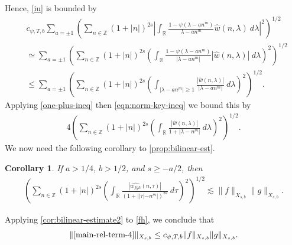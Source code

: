\documentclass[12pt,reqno]{amsart}
\numberwithin{equation}{section}  %
\numberwithin{figure}{section}
\newcommand{\rr}{\mathbb{R}}
\newcommand{\zz}{\mathbb{Z}}
\newcommand{\wh}{\widehat}
\theoremstyle{plain}
\newtheorem{corollary}{Corollary}
\theoremstyle{definition}
\theoremstyle{remark}
\begin{document}
%
Hence, \eqref{iu} is bounded by
%
\begin{equation}
  \begin{split}
    & c_{\psi, T, b} \sum_{a = \pm 1}\left( \sum_{n \in \zz} \left (1 + |n| \right )^{2s} | \int_\rr
		\frac{1 - \psi\left( \lambda - an^{m } \right)}{\lambda - an^{m }}
		\wh{w}(n, \lambda) \ d\lambda |^2 \right)^{1/2}
		\\
		& \simeq \sum_{a = \pm 1} \left( \sum_{n \in \zz} \left (1 + |n| \right )^{2s}  \left ( \int_\rr
		\frac{1 - \psi\left( \lambda - an^{m } \right)}{|\lambda - an^{m }|}
		|\wh{w}(n, \lambda) | \ d\lambda \right )^2 \right)^{1/2}
		\\
		& \le \sum_{a = \pm 1} \left( \sum_{n \in \zz} \left (1 + |n| \right )^{2s}  \left ( \int_{| \lambda - 
		an^{m } | \ge 1}
		\frac{|\wh{w}(n, \lambda) | }{|\lambda - an^{m }|}
		\ d\lambda \right )^2 \right)^{1/2}.
  \end{split}
\end{equation}
Applying \eqref{one-plus-ineq} then \eqref{eqn:norm-key-ineq} we bound this by
\begin{equation}
  \label{fh}
\begin{split}
    4 \left( \sum_{n \in \zz} \left (1 + |n| \right )^{2s}  \left ( \int_\rr
    \frac{|\wh{w}(n, \lambda)| }{1 + |\lambda - n^{m }|}
    \ d\lambda \right )^2 \right)^{1/2}.
	\end{split}
\end{equation}
%
%
%
We now need the following corollary to
\autoref{prop:bilinear-est}.
%
%
%
%
%
%
%
%
\begin{corollary}
\label{cor:bilinear-estimate2}
	If $a > 1/4$, $b > 1/2$, and $s \ge -a/2$, 
  then 
%
%
\begin{equation}
	\label{bilinear-estimate2}
	\begin{split}
		\left( \sum_{n \in \zz} \left (1 + |n| \right )^{2s}  \left ( \int_\rr 
    \frac{|\wh{w_{fgh}}(n, \tau) |}{(1 + | |\tau| - n^{m } |)^{2a}}
		 \ d\tau \right)^2  \right)^{1/2} \lesssim \|f\|_{X_{s,b}} \|g\|_{X_{s,b}}.
	\end{split}
\end{equation}
\end{corollary}
Applying \autoref{cor:bilinear-estimate2} to \eqref{fh}, we
conclude that
%
%
\begin{equation}
	\label{main-int3-est}
	\begin{split}
		\|\eqref{main-rel-term-4}\|_{X_{s,b}} 
    \le c_{\psi, T, b} \|f\|_{X_{s,b}} \|g\|_{X_{s,b}}. 
	\end{split}
\end{equation}
%
%
%
\end{document}
